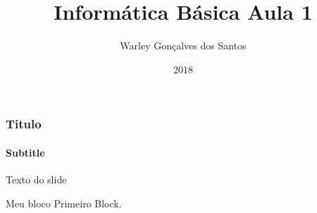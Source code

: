\documentclass[12pt,a4paper,final]{beamer}
\author{Warley Gonçalves dos Santos}
\title{Informática Básica Aula 1}
\institute{Associação Gesto de Amor}
\date{2018}
\begin{document}
	\begin{frame}
		\titlepage
	\end{frame}
    
    \begin{frame}
        \frametitle{Titulo}
        \framesubtitle{Subtitle}
        Texto do slide
        \begin{block}{Meu bloco}
        Primeiro Block.
        \end{block}
	\end{frame}
\end{document}
